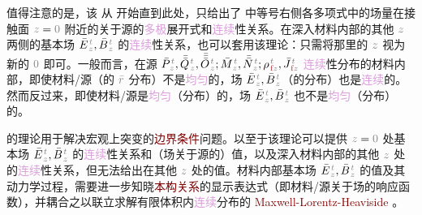 值得注意的是，该  从  开始直到此处，只给出了  中等号右侧各多项式中的场量在接触面 $\mathcolor{gray}{z \mathcolor{black}{=} 0}$ 附近的关于源的\textcolor{Plum}{多极}展开式和\textcolor{Plum}{连续}性关系。在深入材料内部的其他 $\mathcolor{gray}{z}$ 两侧的\textcolor{NavyBlue}{基本场} $\bar{E}^{\;\!\mathcolor{gray}{t}}_{\;\!\mathcolor{gray}{z}}, \bar{B}^{\;\!\mathcolor{gray}{t}}_{\;\!\mathcolor{gray}{z}}$ 的\textcolor{Plum}{连续}性关系，也可以套用该理论：只需将那里的 $\mathcolor{gray}{z}$ 视为新的 $\mathcolor{gray}{0}$ 即可。一般而言，在源 $\bar{P}^{\;\!\mathcolor{gray}{t}}_{\;\!\mathcolor{gray}{z}},\bar{\bar{Q}}^{\;\!\mathcolor{gray}{t}}_{\;\!\mathcolor{gray}{z}},\bar{\bar{\bar{O}}}^{\;\!\mathcolor{gray}{t}}_{\;\!\mathcolor{gray}{z}} ; \bar{M}^{\;\!\mathcolor{gray}{t}}_{\;\!\mathcolor{gray}{z}}, \bar{\bar{N}}^{\;\!\mathcolor{gray}{t}}_{\;\!\mathcolor{gray}{z}};{\rho}^{\;\!\mathcolor{gray}{t}}_{\;\!\textcolor{Maroon}{\text{f}}\mathcolor{gray}{z}}, \bar{J}^{\;\!\mathcolor{gray}{t}}_{\;\!\textcolor{Maroon}{\text{f}}\mathcolor{gray}{z}}$ \textcolor{Plum}{连续}性分布的材料内部，即使材料/源（的 $\mathcolor{gray}{\bar{r}}$ 分布）不是\textcolor{Plum}{均匀}的，场 $\bar{E}^{\;\!\mathcolor{gray}{t}}_{\;\!\mathcolor{gray}{z}}, \bar{B}^{\;\!\mathcolor{gray}{t}}_{\;\!\mathcolor{gray}{z}}$（的分布）也是\textcolor{Plum}{连续}的。然而反过来，即使材料/源是\textcolor{Plum}{均匀}（分布）的，场 $\bar{E}^{\;\!\mathcolor{gray}{t}}_{\;\!\mathcolor{gray}{z}}, \bar{B}^{\;\!\mathcolor{gray}{t}}_{\;\!\mathcolor{gray}{z}}$ 也不是\textcolor{Plum}{均匀}（分布）的。

 的理论用于解决宏观上突变的\textcolor{Maroon}{边界条件}问题。以至于该理论可以提供 $\mathcolor{gray}{z \mathcolor{black}{=} 0}$ 处\textcolor{NavyBlue}{基本场} $\bar{E}^{\;\!\mathcolor{gray}{t}}_{\;\!\mathcolor{gray}{z}}, \bar{B}^{\;\!\mathcolor{gray}{t}}_{\;\!\mathcolor{gray}{z}}$ 的\textcolor{Plum}{连续}性关系和（场关于源的）值，以及深入材料内部的其他 $\mathcolor{gray}{z}$ 处的\textcolor{Plum}{连续}性关系，但无法给出在其他 $\mathcolor{gray}{z}$ 处的值。材料内部\textcolor{NavyBlue}{基本场} $\bar{E}^{\;\!\mathcolor{gray}{t}}_{\;\!\mathcolor{gray}{z}}, \bar{B}^{\;\!\mathcolor{gray}{t}}_{\;\!\mathcolor{gray}{z}}$ 的值及其动力学过程，需要进一步知晓\textcolor{Maroon}{本构关系}的显示表达式（即材料/源关于场的响应函数）\cite{raabMultipoleTheoryElectromagnetism2004}，并耦合之以联立求解有限体积内\textcolor{Plum}{连续}分布\cite{landauCHAPTERXIELECTROMAGNETIC1984}的 \textcolor{Maroon}{Maxwell-Lorentz-Heaviside} 。

